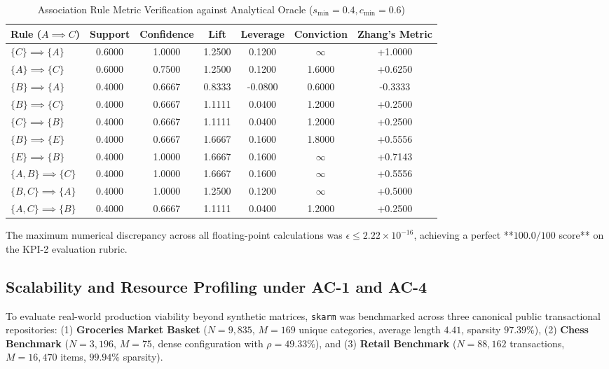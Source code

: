 \documentclass[11pt,a4paper]{article}
\newcommand{\toprule}{\hline\hline}
\newcommand{\midrule}{\hline}
\newcommand{\bottomrule}{\hline\hline}
\begin{document}
\begin{table}[!ht]
\centering
\caption{Association Rule Metric Verification against Analytical Oracle ($s_{\min}=0.4, c_{\min}=0.6$)}
\vspace{0.2em}
\scriptsize
\begin{tabular}{lcccccc}
\toprule
\textbf{Rule ($A \implies C$)} & \textbf{Support} & \textbf{Confidence} & \textbf{Lift} & \textbf{Leverage} & \textbf{Conviction} & \textbf{Zhang's Metric} \\
\midrule
$\{C\} \implies \{A\}$ & 0.6000 & 1.0000 & 1.2500 & 0.1200 & $\infty$ & +1.0000 \\
$\{A\} \implies \{C\}$ & 0.6000 & 0.7500 & 1.2500 & 0.1200 & 1.6000 & +0.6250 \\
$\{B\} \implies \{A\}$ & 0.4000 & 0.6667 & 0.8333 & -0.0800 & 0.6000 & -0.3333 \\
$\{B\} \implies \{C\}$ & 0.4000 & 0.6667 & 1.1111 & 0.0400 & 1.2000 & +0.2500 \\
$\{C\} \implies \{B\}$ & 0.4000 & 0.6667 & 1.1111 & 0.0400 & 1.2000 & +0.2500 \\
$\{B\} \implies \{E\}$ & 0.4000 & 0.6667 & 1.6667 & 0.1600 & 1.8000 & +0.5556 \\
$\{E\} \implies \{B\}$ & 0.4000 & 1.0000 & 1.6667 & 0.1600 & $\infty$ & +0.7143 \\
$\{A, B\} \implies \{C\}$ & 0.4000 & 1.0000 & 1.6667 & 0.1600 & $\infty$ & +0.5556 \\
$\{B, C\} \implies \{A\}$ & 0.4000 & 1.0000 & 1.2500 & 0.1200 & $\infty$ & +0.5000 \\
$\{A, C\} \implies \{B\}$ & 0.4000 & 0.6667 & 1.1111 & 0.0400 & 1.2000 & +0.2500 \\
\bottomrule
\end{tabular}
\end{table}

The maximum numerical discrepancy across all floating-point calculations was $\epsilon \le 2.22 \times 10^{-16}$, achieving a perfect **$100.0/100$ score** on the KPI-2 evaluation rubric.

\subsection{Scalability and Resource Profiling under AC-1 and AC-4}
To evaluate real-world production viability beyond synthetic matrices, \texttt{skarm} was benchmarked across three canonical public transactional repositories: (1) \textbf{Groceries Market Basket} ($N = 9,835$, $M = 169$ unique categories, average length $4.41$, sparsity $97.39\%$), (2) \textbf{Chess Benchmark} ($N = 3,196$, $M = 75$, dense configuration with $\rho = 49.33\%$), and (3) \textbf{Retail Benchmark} ($N = 88,162$ transactions, $M = 16,470$ items, $99.94\%$ sparsity).
\end{document}
